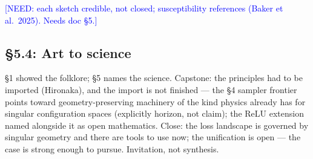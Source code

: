 \documentclass[11pt]{article}
\newcommand{\tagg}[1]{\textcolor{blue}{[#1]}}
\begin{document}
\tagg{NEED: each sketch credible, not closed; susceptibility references
(Baker et al.\ 2025). Needs doc \S5.}

\subsection*{\S5.4: Art to science}

\S1 showed the folklore; \S5 names the science. Capstone: the principles
had to be imported (Hironaka), and the import is not finished --- the
\S4 sampler frontier points toward geometry-preserving machinery of the
kind physics already has for singular configuration spaces (explicitly
horizon, not claim); the ReLU extension named alongside it as open
mathematics. Close: the loss landscape is governed by singular geometry
and there are tools to use now; the unification is open --- the case is
strong enough to pursue. Invitation, not synthesis.
\end{document}
